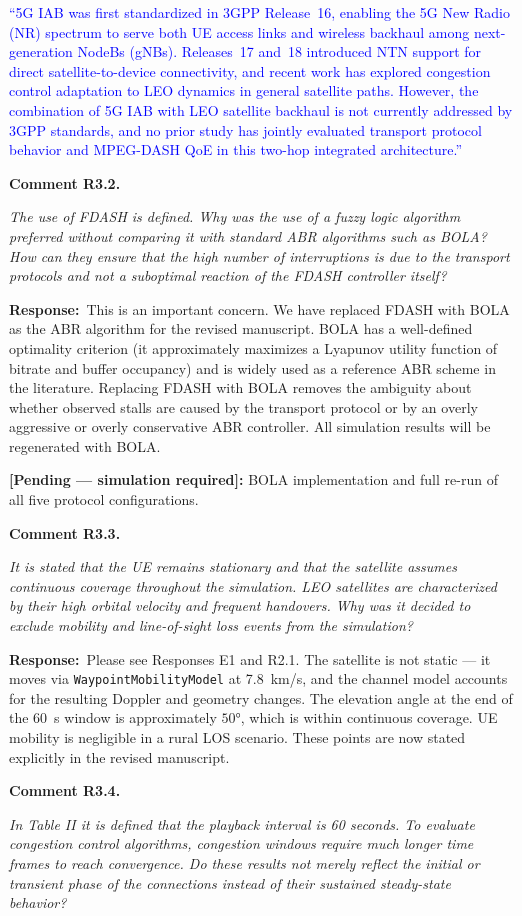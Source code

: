 \documentclass[11pt]{article}
\newcommand{\comment}[2]{\vspace{0.8em}\noindent\textbf{Comment #1.}\begin{reviewbox}\textit{#2}\end{reviewbox}}
\newcommand{\response}{\noindent\textbf{Response:}~}
\newcommand{\revised}[1]{\textcolor{blue}{``#1''}}
\newcommand{\pending}[1]{\textcolor{red!70!black}{\textbf{[Pending — simulation required]:} #1}}
\begin{document}
\revised{5G IAB was first standardized in 3GPP Release~16, enabling the 5G New Radio (NR) spectrum to serve both UE access links and wireless backhaul among next-generation NodeBs (gNBs). Releases~17 and~18 introduced NTN support for direct satellite-to-device connectivity, and recent work has explored congestion control adaptation to LEO dynamics in general satellite paths. However, the combination of 5G IAB with LEO satellite backhaul is not currently addressed by 3GPP standards, and no prior study has jointly evaluated transport protocol behavior and MPEG-DASH QoE in this two-hop integrated architecture.}

\comment{R3.2}{The use of FDASH is defined. Why was the use of a fuzzy logic algorithm preferred without comparing it with standard ABR algorithms such as BOLA? How can they ensure that the high number of interruptions is due to the transport protocols and not a suboptimal reaction of the FDASH controller itself?}

\response This is an important concern. We have replaced FDASH with BOLA as the ABR algorithm for the revised manuscript. BOLA has a well-defined optimality criterion (it approximately maximizes a Lyapunov utility function of bitrate and buffer occupancy) and is widely used as a reference ABR scheme in the literature. Replacing FDASH with BOLA removes the ambiguity about whether observed stalls are caused by the transport protocol or by an overly aggressive or overly conservative ABR controller. All simulation results will be regenerated with BOLA.

\pending{BOLA implementation and full re-run of all five protocol configurations.}

\comment{R3.3}{It is stated that the UE remains stationary and that the satellite assumes continuous coverage throughout the simulation. LEO satellites are characterized by their high orbital velocity and frequent handovers. Why was it decided to exclude mobility and line-of-sight loss events from the simulation?}

\response Please see Responses E1 and R2.1. The satellite is not static — it moves via \texttt{WaypointMobilityModel} at 7.8~km/s, and the channel model accounts for the resulting Doppler and geometry changes. The elevation angle at the end of the 60~s window is approximately $50°$, which is within continuous coverage. UE mobility is negligible in a rural LOS scenario. These points are now stated explicitly in the revised manuscript.

\comment{R3.4}{In Table II it is defined that the playback interval is 60 seconds. To evaluate congestion control algorithms, congestion windows require much longer time frames to reach convergence. Do these results not merely reflect the initial or transient phase of the connections instead of their sustained steady-state behavior?}
\end{document}
